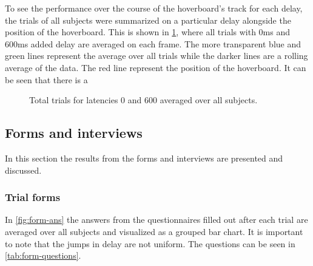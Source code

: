 \documentclass[nofilelist]{cslthse-msc}
\begin{document}
To see the performance over the course of the hoverboard's track for each delay, the trials of all subjects were summarized on a particular delay alongside the position of the hoverboard. This is shown in \ref{fig:0vs600}, where all trials with 0ms and 600ms added delay are averaged on each frame. The more transparent blue and green lines represent the average over all trials while the darker lines are a rolling average of the data. The red line represent the position of the hoverboard.
It can be seen that there is a    

\begin{figure}[!hbt]
   \centering
   \caption{Total trials for latencies 0 and 600 averaged over all subjects.}
   \label{fig:0vs600}
\end{figure}


\subsection{Forms and interviews}
In this section the results from the forms and interviews are presented and discussed.

\subsubsection{Trial forms}
In \ref{fig:form-ans} the answers from the questionnaires filled out after each trial are averaged over all subjects and visualized as a grouped bar chart. It is important to note that the jumps in delay are not uniform. The questions can be seen in \ref{tab:form-questions}. 
\end{document}
